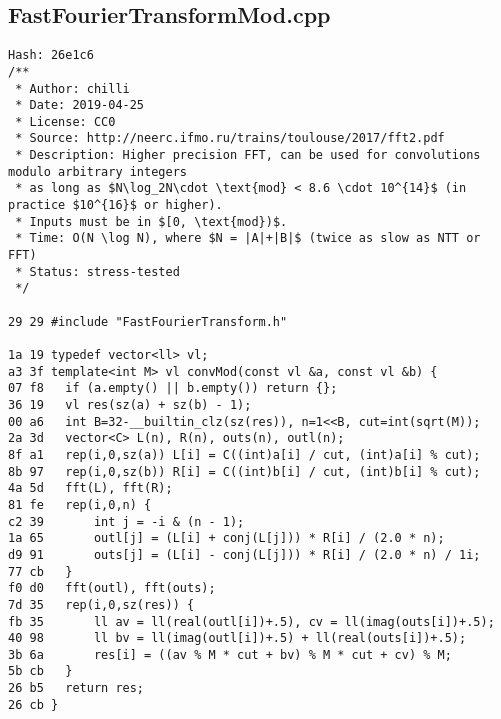 \documentclass[11pt, a4paper, twoside]{article}
\begin{document}
\subsection{FastFourierTransformMod.cpp}
\begin{lstlisting}
Hash: 26e1c6
/**
 * Author: chilli
 * Date: 2019-04-25
 * License: CC0
 * Source: http://neerc.ifmo.ru/trains/toulouse/2017/fft2.pdf
 * Description: Higher precision FFT, can be used for convolutions modulo arbitrary integers
 * as long as $N\log_2N\cdot \text{mod} < 8.6 \cdot 10^{14}$ (in practice $10^{16}$ or higher).
 * Inputs must be in $[0, \text{mod})$.
 * Time: O(N \log N), where $N = |A|+|B|$ (twice as slow as NTT or FFT)
 * Status: stress-tested
 */

29 29 #include "FastFourierTransform.h"

1a 19 typedef vector<ll> vl;
a3 3f template<int M> vl convMod(const vl &a, const vl &b) {
07 f8 	if (a.empty() || b.empty()) return {};
36 19 	vl res(sz(a) + sz(b) - 1);
00 a6 	int B=32-__builtin_clz(sz(res)), n=1<<B, cut=int(sqrt(M));
2a 3d 	vector<C> L(n), R(n), outs(n), outl(n);
8f a1 	rep(i,0,sz(a)) L[i] = C((int)a[i] / cut, (int)a[i] % cut);
8b 97 	rep(i,0,sz(b)) R[i] = C((int)b[i] / cut, (int)b[i] % cut);
4a 5d 	fft(L), fft(R);
81 fe 	rep(i,0,n) {
c2 39 		int j = -i & (n - 1);
1a 65 		outl[j] = (L[i] + conj(L[j])) * R[i] / (2.0 * n);
d9 91 		outs[j] = (L[i] - conj(L[j])) * R[i] / (2.0 * n) / 1i;
77 cb 	}
f0 d0 	fft(outl), fft(outs);
7d 35 	rep(i,0,sz(res)) {
fb 35 		ll av = ll(real(outl[i])+.5), cv = ll(imag(outs[i])+.5);
40 98 		ll bv = ll(imag(outl[i])+.5) + ll(real(outs[i])+.5);
3b 6a 		res[i] = ((av % M * cut + bv) % M * cut + cv) % M;
5b cb 	}
26 b5 	return res;
26 cb }
\end{lstlisting}
\end{document}
